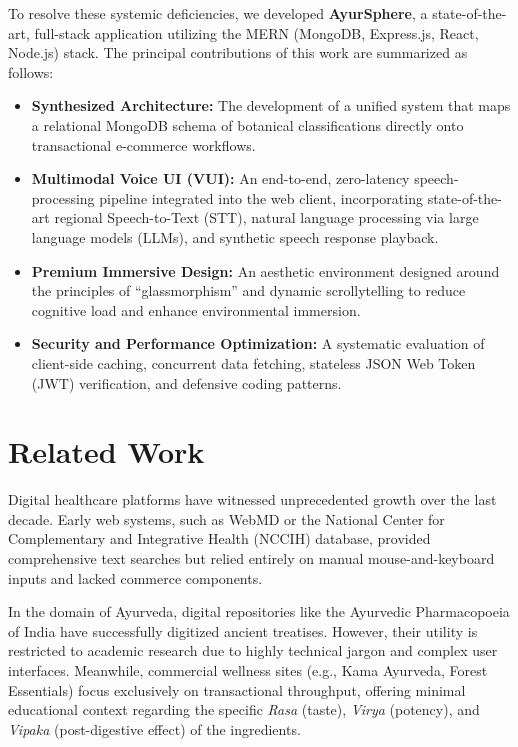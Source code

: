 \documentclass[conference]{IEEEtran}
\begin{document}
To resolve these systemic deficiencies, we developed \textbf{AyurSphere}, a state-of-the-art, full-stack application utilizing the MERN (MongoDB, Express.js, React, Node.js) stack. The principal contributions of this work are summarized as follows:
\begin{itemize}
    \item \textbf{Synthesized Architecture:} The development of a unified system that maps a relational MongoDB schema of botanical classifications directly onto transactional e-commerce workflows.
    \item \textbf{Multimodal Voice UI (VUI):} An end-to-end, zero-latency speech-processing pipeline integrated into the web client, incorporating state-of-the-art regional Speech-to-Text (STT), natural language processing via large language models (LLMs), and synthetic speech response playback.
    \item \textbf{Premium Immersive Design:} An aesthetic environment designed around the principles of ``glassmorphism'' and dynamic scrollytelling to reduce cognitive load and enhance environmental immersion.
    \item \textbf{Security and Performance Optimization:} A systematic evaluation of client-side caching, concurrent data fetching, stateless JSON Web Token (JWT) verification, and defensive coding patterns.
\end{itemize}

\section{Related Work}
Digital healthcare platforms have witnessed unprecedented growth over the last decade. Early web systems, such as WebMD or the National Center for Complementary and Integrative Health (NCCIH) database, provided comprehensive text searches but relied entirely on manual mouse-and-keyboard inputs and lacked commerce components.

In the domain of Ayurveda, digital repositories like the Ayurvedic Pharmacopoeia of India have successfully digitized ancient treatises. However, their utility is restricted to academic research due to highly technical jargon and complex user interfaces. Meanwhile, commercial wellness sites (e.g., Kama Ayurveda, Forest Essentials) focus exclusively on transactional throughput, offering minimal educational context regarding the specific \textit{Rasa} (taste), \textit{Virya} (potency), and \textit{Vipaka} (post-digestive effect) of the ingredients.
\end{document}
